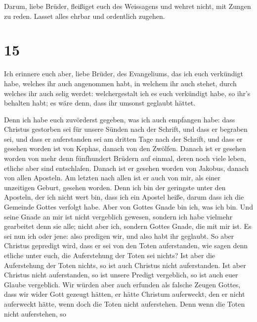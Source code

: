  Darum, liebe Brüder, fleißiget euch des Weissagens und
wehret nicht, mit Zungen zu reden.  Lasset alles ehrbar
und ordentlich zugehen.

\hypertarget{section-14}{%
\section{15}\label{section-14}}

 Ich erinnere euch aber, liebe Brüder, des Evangeliums,
das ich euch verkündigt habe, welches ihr auch angenommen habt, in
welchem ihr auch stehet,  durch welches ihr auch selig
werdet: welchergestalt ich es euch verkündigt habe, so ihr's behalten
habt; es wäre denn, dass ihr umsonst geglaubt hättet.

 Denn ich habe euch zuvörderst gegeben, was ich auch
empfangen habe: dass Christus gestorben sei für unsere Sünden nach der
Schrift,  und dass er begraben sei, und dass er
auferstanden sei am dritten Tage nach der Schrift,  und
dass er gesehen worden ist von Kephas, danach von den Zwölfen.
 Danach ist er gesehen worden von mehr denn fünfhundert
Brüdern auf einmal, deren noch viele leben, etliche aber sind
entschlafen.  Danach ist er gesehen worden von Jakobus,
danach von allen Aposteln.  Am letzten nach allen ist er
auch von mir, als einer unzeitigen Geburt, gesehen worden.
 Denn ich bin der geringste unter den Aposteln, der ich
nicht wert bin, dass ich ein Apostel heiße, darum dass ich die Gemeinde
Gottes verfolgt habe.  Aber von Gottes Gnade bin ich, was
ich bin. Und seine Gnade an mir ist nicht vergeblich gewesen, sondern
ich habe vielmehr gearbeitet denn sie alle; nicht aber ich, sondern
Gottes Gnade, die mit mir ist.  Es sei nun ich oder jene:
also predigen wir, und also habt ihr geglaubt.  So aber
Christus gepredigt wird, dass er sei von den Toten auferstanden, wie
sagen denn etliche unter euch, die Auferstehung der Toten sei nichts?
 Ist aber die Auferstehung der Toten nichts, so ist auch
Christus nicht auferstanden.  Ist aber Christus nicht
auferstanden, so ist unsere Predigt vergeblich, so ist auch euer Glaube
vergeblich.  Wir würden aber auch erfunden als falsche
Zeugen Gottes, dass wir wider Gott gezeugt hätten, er hätte Christum
auferweckt, den er nicht auferweckt hätte, wenn doch die Toten nicht
auferstehen.  Denn wenn die Toten nicht auferstehen, so
